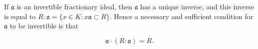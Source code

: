 If $\mathfrak{a}$ is an invertible fractionary ideal, then $\mathfrak{a}$ has a unique inverse, and this inverse is equal to $R:\mathfrak{a} = \{x \in K : x\mathfrak{a} \subset R\}$. Hence a necessary and sufficient condition for $\mathfrak{a}$ to be invertible is that

$$\mathfrak{a} \cdot (R:\mathfrak{a}) = R.$$
